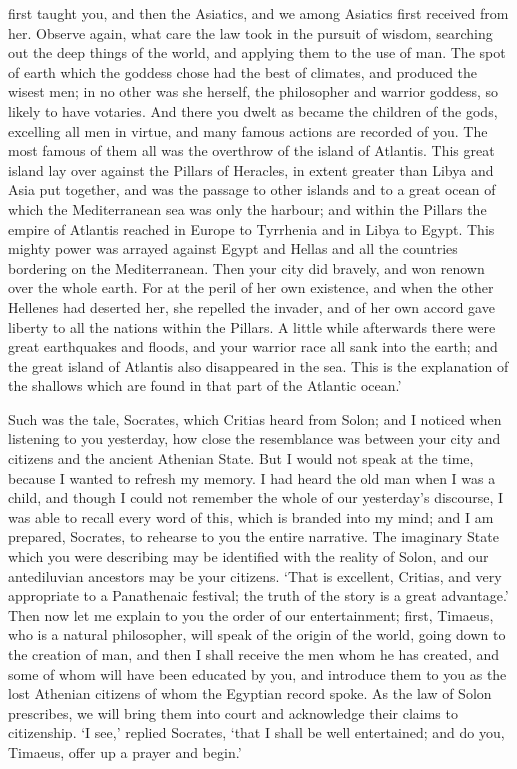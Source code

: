 first taught you, and then the Asiatics, and we among Asiatics first
received from her. Observe again, what care the law took in the pursuit of
wisdom, searching out the deep things of the world, and applying them to
the use of man. The spot of earth which the goddess chose had the best of
climates, and produced the wisest men; in no other was she herself, the
philosopher and warrior goddess, so likely to have votaries. And there you
dwelt as became the children of the gods, excelling all men in virtue, and
many famous actions are recorded of you. The most famous of them all was
the overthrow of the island of Atlantis. This great island lay over
against the Pillars of Heracles, in extent greater than Libya and Asia put
together, and was the passage to other islands and to a great ocean of
which the Mediterranean sea was only the harbour; and within the Pillars
the empire of Atlantis reached in Europe to Tyrrhenia and in Libya to
Egypt. This mighty power was arrayed against Egypt and Hellas and all the
countries bordering on the Mediterranean. Then your city did bravely, and
won renown over the whole earth. For at the peril of her own existence,
and when the other Hellenes had deserted her, she repelled the invader,
and of her own accord gave liberty to all the nations within the Pillars.
A little while afterwards there were great earthquakes and floods, and
your warrior race all sank into the earth; and the great island of
Atlantis also disappeared in the sea. This is the explanation of the
shallows which are found in that part of the Atlantic ocean.’

Such was the tale, Socrates, which Critias heard from Solon; and I noticed
when listening to you yesterday, how close the resemblance was between
your city and citizens and the ancient Athenian State. But I would not
speak at the time, because I wanted to refresh my memory. I had heard the
old man when I was a child, and though I could not remember the whole of
our yesterday’s discourse, I was able to recall every word of this, which
is branded into my mind; and I am prepared, Socrates, to rehearse to you
the entire narrative. The imaginary State which you were describing may be
identified with the reality of Solon, and our antediluvian ancestors may
be your citizens. ‘That is excellent, Critias, and very appropriate to a
Panathenaic festival; the truth of the story is a great advantage.’ Then
now let me explain to you the order of our entertainment; first, Timaeus,
who is a natural philosopher, will speak of the origin of the world, going
down to the creation of man, and then I shall receive the men whom he has
created, and some of whom will have been educated by you, and introduce
them to you as the lost Athenian citizens of whom the Egyptian record
spoke. As the law of Solon prescribes, we will bring them into court and
acknowledge their claims to citizenship. ‘I see,’ replied Socrates, ‘that
I shall be well entertained; and do you, Timaeus, offer up a prayer and
begin.’


